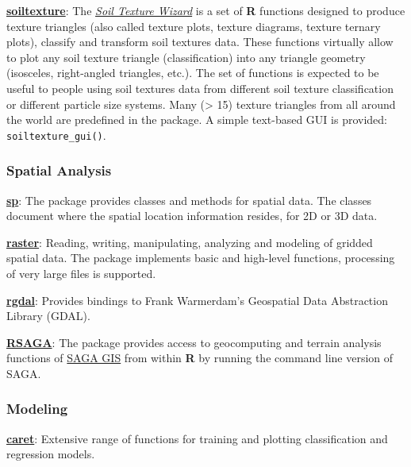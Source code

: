 \documentclass[10pt,b5paper,]{book}
\theoremstyle{definition}
\theoremstyle{definition}
\theoremstyle{definition}
\theoremstyle{remark}
\begin{document}
\href{https://CRAN.R-project.org/package=soiltexture}{\textbf{soiltexture}}:
The
\href{https://cran.r-project.org/web/packages/soiltexture/vignettes/soiltexture_vignette.pdf}{\emph{Soil
Texture Wizard}} is a set of \textbf{R} functions designed to produce
texture triangles (also called texture plots, texture diagrams, texture
ternary plots), classify and transform soil textures data. These
functions virtually allow to plot any soil texture triangle
(classification) into any triangle geometry (isosceles, right-angled
triangles, etc.). The set of functions is expected to be useful to
people using soil textures data from different soil texture
classification or different particle size systems. Many (\textgreater{}
15) texture triangles from all around the world are predefined in the
package. A simple text-based GUI is provided:
\texttt{soiltexture\_gui()}.

\hypertarget{spatial-analysis}{%
\subsubsection{Spatial Analysis}\label{spatial-analysis}}

\href{https://CRAN.R-project.org/package=sp}{\textbf{sp}}: The package
provides classes and methods for spatial data. The classes document
where the spatial location information resides, for 2D or 3D data.

\href{https://CRAN.R-project.org/package=raster}{\textbf{raster}}:
Reading, writing, manipulating, analyzing and modeling of gridded
spatial data. The package implements basic and high-level functions,
processing of very large files is supported.

\href{https://CRAN.R-project.org/package=rgdal}{\textbf{rgdal}}:
Provides bindings to Frank Warmerdam's Geospatial Data Abstraction
Library (GDAL).

\href{https://CRAN.R-project.org/package=RSAGA}{\textbf{RSAGA}}: The
package provides access to geocomputing and terrain analysis functions
of \href{/url\%7Bhttp://www.saga-gis.org/en/index.html\%7D}{SAGA GIS}
from within \textbf{R} by running the command line version of SAGA.

\hypertarget{modeling}{%
\subsubsection{Modeling}\label{modeling}}

\href{https://CRAN.R-project.org/package=caret}{\textbf{caret}}:
Extensive range of functions for training and plotting classification
and regression models.
\end{document}
